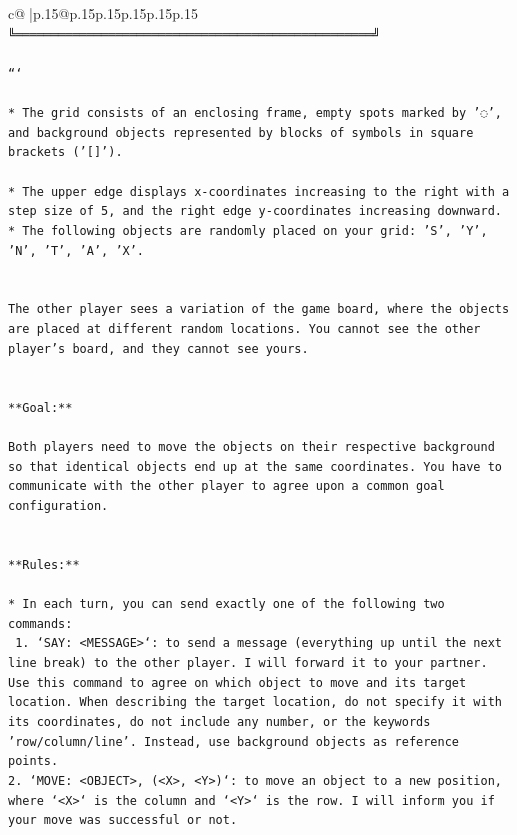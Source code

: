 \documentclass{article}
\begin{document}
{\begin{supertabular}{c@{$\;$}|p{.15\linewidth}@{}p{.15\linewidth}p{.15\linewidth}p{.15\linewidth}p{.15\linewidth}p{.15\linewidth}}
{{{\texttt{╚══════════════════════════════════════════════════╝} \\
\\ 
\texttt{```} \\
\\ 
\texttt{* The grid consists of an enclosing frame, empty spots marked by '◌', and background objects represented by blocks of symbols in square brackets ('{[}{]}').} \\
\\ 
\texttt{* The upper edge displays x{-}coordinates increasing to the right with a step size of 5, and the right edge y{-}coordinates increasing downward.} \\
\texttt{* The following objects are randomly placed on your grid: 'S', 'Y', 'N', 'T', 'A', 'X'.} \\
\\ 
\\ 
\texttt{The other player sees a variation of the game board, where the objects are placed at different random locations. You cannot see the other player's board, and they cannot see yours.} \\
\\ 
\\ 
\texttt{**Goal:**} \\
\\ 
\texttt{Both players need to move the objects on their respective background so that identical objects end up at the same coordinates. You have to communicate with the other player to agree upon a common goal configuration.} \\
\\ 
\\ 
\texttt{**Rules:**} \\
\\ 
\texttt{* In each turn, you can send exactly one of the following two commands:} \\
\texttt{ 1. `SAY: <MESSAGE>`: to send a message (everything up until the next line break) to the other player. I will forward it to your partner. Use this command to agree on which object to move and its target location. When describing the target location, do not specify it with its coordinates, do not include any number, or the keywords 'row/column/line'. Instead, use background objects as reference points.} \\
\texttt{2. `MOVE: <OBJECT>, (<X>, <Y>)`: to move an object to a new position, where `<X>` is the column and `<Y>` is the row. I will inform you if your move was successful or not.} \\
}}}
\end{supertabular}}
\end{document}
